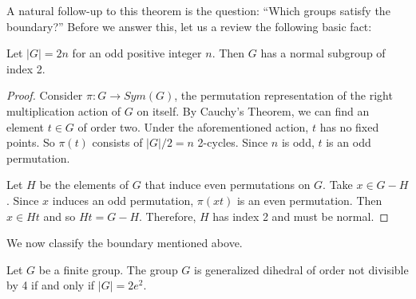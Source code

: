 \documentclass[main.tex]{subfiles}
\begin{document}
A natural follow-up to this theorem is the question: ``Which groups satisfy the boundary?'' Before we answer this, let us a review the following basic fact:

\begin{lemma}
Let $|G| = 2n$ for an odd positive integer $n$. Then $G$ has a normal subgroup of index 2. 
\end{lemma}

\begin{proof}
Consider $\pi: G \to Sym(G)$, the permutation representation of the right multiplication action of $G$ on itself. By Cauchy's Theorem, we can find an element $t \in G$ of order two. Under the aforementioned action, $t$ has no fixed points. So $\pi(t)$ consists of $|G|/2 = n$ 2-cycles. Since $n$ is odd, $t$ is an odd permutation.

Let $H$ be the elements of $G$ that induce even permutations on $G$. Take $x \in G - H$. Since $x$ induces an odd permutation, $\pi(xt)$ is an even permutation. Then $x \in Ht$ and so $Ht = G- H$. Therefore, $H$ has index 2 and must be normal.
\end{proof}

We now classify the boundary mentioned above.

\begin{theorem}
Let $G$ be a finite group. The group $G$ is generalized dihedral of order not divisible by 4 if and only if $|G| = 2e^2$. 
\end{theorem}
\end{document}
